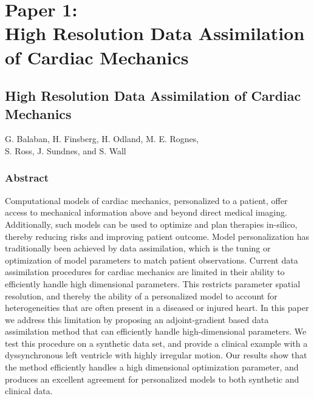 
\graphicspath{{chapters/paper1/figures/}}


\chapter{Paper 1: \\High Resolution Data Assimilation of Cardiac
  Mechanics}

\newpage
\renewcommand{\thefootnote}{\fnsymbol{footnote}}

\section*{High Resolution Data Assimilation of Cardiac Mechanics}

G. Balaban\footnotemark,
H. Finsberg\footnotemark[\value{footnote}], 
H. Odland, M. E. Rognes, \\
S. Ross, J. Sundnes, and
S. Wall

\subsection*{Abstract}



Computational models of cardiac mechanics, personalized to a patient, offer access 
to mechanical information above and beyond direct medical imaging.
Additionally, such models
can be used to optimize and plan therapies in-silico, thereby reducing risks and
improving patient outcome. Model personalization has traditionally been achieved by data
assimilation, which is the tuning or optimization of model parameters
to match patient observations.
Current data assimilation procedures for cardiac mechanics are limited in their ability
to efficiently handle high dimensional parameters.
This restricts parameter spatial resolution, and thereby the ability
of a personalized model to account for heterogeneities that are often present in
a diseased or injured heart.
In this paper we address this limitation by
proposing an adjoint-gradient based data assimilation method
that can efficiently handle high-dimensional
parameters. We test this procedure on a synthetic data set,
and provide a clinical example with
a dyssynchronous left ventricle with highly irregular motion.
Our results show that the method efficiently handles a high dimensional
optimization parameter, and produces an excellent agreement
for personalized models to both synthetic and clinical data.

